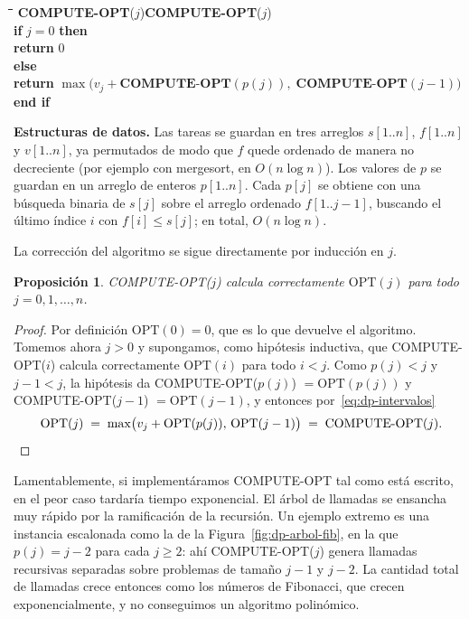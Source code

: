 \documentclass[12pt, spanish, oneside, openany]{book}
\newcommand{\pl}[1]{\makebox[1.6em][r]{\texttt{\footnotesize #1}}\hspace{0.9em}}
\newenvironment{pseudo}[1]{%
  \begin{center}%
  \begin{mdframed}[style=pseudobox]%
  \small
  \begin{tabbing}%
  \hspace{2.5em}\=\hspace{1.5em}\=\hspace{1.5em}\=\hspace{1.5em}\=\hspace{1.5em}\=\kill
  \def\pseudotitulo{#1}\ifx\pseudotitulo\empty\else#1\\[3pt]\fi}%
  {\end{tabbing}\end{mdframed}\end{center}}
\newenvironment{estructuras}%
  {\begin{center}\begin{minipage}{0.93\textwidth}\begin{mdframed}[style=estrbox]%
   \small\textbf{Estructuras de datos.}\;}%
  {\end{mdframed}\end{minipage}\end{center}}
\newcommand{\alg}[1]{#1}
\theoremstyle{uprightplain}
\newtheorem{proposicion}[teorema]{Proposición}
\theoremstyle{definition}
\theoremstyle{remark}
\theoremstyle{definition}
\newcommand{\OPT}{\mathrm{OPT}} %
\begin{document}
\begin{pseudo}{\textbf{COMPUTE-OPT}($j$)}
\pl{1}\> \textbf{if} $j = 0$ \textbf{then}\\
\pl{2}\>\> \textbf{return} $0$\\
\pl{3}\> \textbf{else}\\
\pl{4}\>\> \textbf{return} $\max\bigl(v_j+\textbf{COMPUTE-OPT}(p(j)),\;\textbf{COMPUTE-OPT}(j-1)\bigr)$\\
\pl{5}\> \textbf{end if}
\end{pseudo}

\begin{estructuras}
Las tareas se guardan en tres arreglos $s[1..n]$, $f[1..n]$ y $v[1..n]$, ya
permutados de modo que $f$ quede ordenado de manera no decreciente (por
ejemplo con mergesort, en $O(n\log n)$). Los valores de $p$ se guardan en un
arreglo de enteros $p[1..n]$. Cada $p[j]$ se obtiene con una búsqueda binaria
de $s[j]$ sobre el arreglo ordenado $f[1..j-1]$, buscando el último índice $i$
con $f[i]\le s[j]$; en total, $O(n\log n)$.
\end{estructuras}

La corrección del algoritmo se sigue directamente por inducción en $j$.

\begin{proposicion}
\label{prop:dp-compute-opt}
\alg{COMPUTE-OPT}($j$) calcula correctamente $\OPT(j)$ para todo $j=0,1,\dots,n$.
\end{proposicion}
\begin{proof}
Por definición $\OPT(0)=0$, que es lo que devuelve el algoritmo. Tomemos ahora $j>0$ y supongamos, como hipótesis inductiva, que \alg{COMPUTE-OPT}($i$) calcula correctamente $\OPT(i)$ para todo $i<j$. Como $p(j)<j$ y $j-1<j$, la hipótesis da \alg{COMPUTE-OPT}($p(j)$) $=\OPT(p(j))$ y \alg{COMPUTE-OPT}($j-1$) $=\OPT(j-1)$, y entonces por~\eqref{eq:dp-intervalos}
\[
\OPT(j) \;=\; \max\bigl(v_j+\OPT(p(j)),\,\OPT(j-1)\bigr) \;=\; \text{COMPUTE-OPT}(j). \qedhere
\]
\end{proof}

Lamentablemente, si implementáramos \alg{COMPUTE-OPT} tal como está escrito, en el peor caso tardaría tiempo exponencial. El árbol de llamadas se ensancha muy rápido por la ramificación de la recursión. Un ejemplo extremo es una instancia escalonada como la de la Figura~\ref{fig:dp-arbol-fib}, en la que $p(j)=j-2$ para cada $j\ge 2$: ahí \alg{COMPUTE-OPT}($j$) genera llamadas recursivas separadas sobre problemas de tamaño $j-1$ y $j-2$. La cantidad total de llamadas crece entonces como los números de Fibonacci, que crecen exponencialmente, y no conseguimos un algoritmo polinómico.
\end{document}
